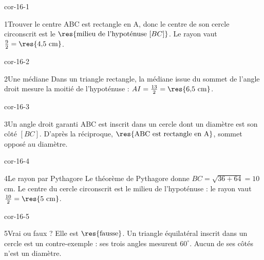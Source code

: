 \clearpage\pagestyle{otMain}\setlength{\otBlocEspacement}{2.5mm}\fontsize{11}{15}\selectfont{}
\begin{blocLivre}{cor-16-1}\begin{corrige}{1}{Trouver le centre}
ABC est rectangle en A, donc le centre de son cercle circonscrit est le $\res{\text{milieu de l’hypoténuse }[BC]}$. Le rayon vaut $\frac92=\res{4{,}5\ \mathrm{cm}}$.
\label{fig-cor-16-1}
\end{corrige}\end{blocLivre}
\begin{blocLivre}{cor-16-2}\begin{corrige}{2}{Une médiane}
Dans un triangle rectangle, la médiane issue du sommet de l’angle droit mesure la moitié de l’hypoténuse : $AI=\frac{13}2=\res{6{,}5\ \mathrm{cm}}$.
\label{fig-cor-16-2}
\end{corrige}\end{blocLivre}
\begin{blocLivre}{cor-16-3}\begin{corrige}{3}{Un angle droit garanti}
ABC est inscrit dans un cercle dont un diamètre est son côté $[BC]$. D’après la réciproque, $\res{\text{ABC est rectangle en A}}$, sommet opposé au diamètre.
\label{fig-cor-16-3}
\end{corrige}\end{blocLivre}
\begin{blocLivre}{cor-16-4}\begin{corrige}{4}{Le rayon par Pythagore}
Le théorème de Pythagore donne $BC=\sqrt{36+64}=10$ cm. Le centre du cercle circonscrit est le milieu de l’hypoténuse : le rayon vaut $\frac{10}2=\res{5\ \mathrm{cm}}$.
\label{fig-cor-16-4}
\end{corrige}\end{blocLivre}
\begin{blocLivre}{cor-16-5}\begin{corrige}{5}{Vrai ou faux ?}
Elle est $\res{\text{fausse}}$. Un triangle équilatéral inscrit dans un cercle est un contre-exemple : ses trois angles mesurent $60^\circ$. Aucun de ses côtés n’est un diamètre.
\label{fig-cor-16-5}
\end{corrige}\end{blocLivre}
